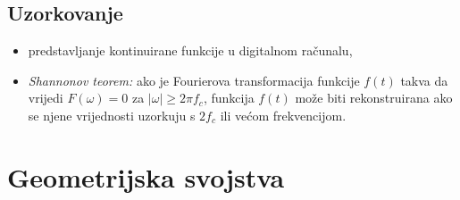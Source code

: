 \documentclass[11pt,english]{article}
\begin{document}
\subsection{Uzorkovanje}
\begin{itemize}
  \item predstavljanje kontinuirane funkcije u digitalnom računalu,
  \item \emph{Shannonov teorem:} ako je Fourierova transformacija funkcije $f(t)$ takva da vrijedi $F(\omega) = 0$ za $|\omega|\geq 2\pi f_c$, funkcija $f(t)$ može biti rekonstruirana ako se njene vrijednosti uzorkuju s $2f_c$ ili većom frekvencijom.
\end{itemize}


\section{Geometrijska svojstva}
\end{document}
